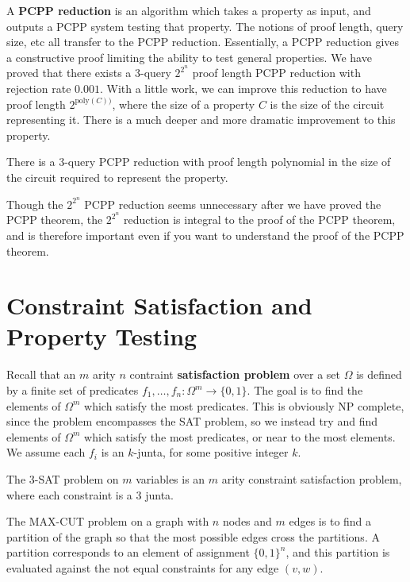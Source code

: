 A {\bf PCPP reduction} is an algorithm which takes a property as input, and outputs a PCPP system testing that property. The notions of proof length, query size, etc all transfer to the PCPP reduction. Essentially, a PCPP reduction gives a constructive proof limiting the ability to test general properties. We have proved that there exists a 3-query $2^{2^n}$ proof length PCPP reduction with rejection rate $0.001$. With a little work, we can improve this reduction to have proof length $2^{\text{poly}(C))}$, where the size of a property $C$ is the size of the circuit representing it. There is a much deeper and more dramatic improvement to this property.

\begin{theorem}[PCPP]
    There is a 3-query PCPP reduction with proof length polynomial in the size of the circuit required to represent the property.
\end{theorem}

Though the $2^{2^n}$ PCPP reduction seems unnecessary after we have proved the PCPP theorem, the $2^{2^n}$ reduction is integral to the proof of the PCPP theorem, and is therefore important even if you want to understand the proof of the PCPP theorem.

\section{Constraint Satisfaction and Property Testing}

Recall that an $m$ arity $n$ contraint {\bf satisfaction problem} over a set $\Omega$ is defined by a finite set of predicates $f_1, \dots, f_n: \Omega^m \to \{ 0, 1 \}$. The goal is to find the elements of $\Omega^m$ which satisfy the most predicates. This is obviously NP complete, since the problem encompasses the SAT problem, so we instead try and find elements of $\Omega^m$ which satisfy the most predicates, or near to the most elements. We assume each $f_i$ is an $k$-junta, for some positive integer $k$.

\begin{example}
    The 3-SAT problem on $m$ variables is an $m$ arity constraint satisfaction problem, where each constraint is a 3 junta.
\end{example}

\begin{example}
    The MAX-CUT problem on a graph with $n$ nodes and $m$ edges is to find a partition of the graph so that the most possible edges cross the partitions. A partition corresponds to an element of assignment $\{ 0, 1 \}^n$, and this partition is evaluated against the not equal constraints for any edge $(v,w)$.
\end{example}

